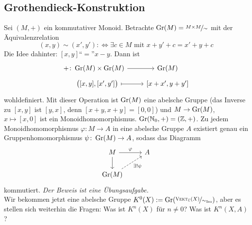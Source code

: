 \subsection*{Grothendieck-Konstruktion}
Sei $(M,+)$ ein kommutativer Monoid. Betrachte $\operatorname{Gr}(M)= \nicefrac{M \times M}{\sim}$ mit der Äquivalenzrelation
\[
	(x,y) \sim (x',y') :\iff \exists c \in M \text{ mit } x+y' +c = x' +y +c
\]
Die Idee dahinter: $[x,y]$\enquote{$=$}$x-y$. Dann ist 
\[
	\begin{tikzcd}[row sep=tiny]
		+ \colon \Gr(M) \times \Gr(M) \rar & \Gr(M) \\
		\quad \enbrace[\big]{[x,y] , [x',y']} \rar[mapsto] & \benbrace*{x+x',y+y'}  
	\end{tikzcd}
\]
wohldefiniert. Mit dieser Operation ist $\operatorname{Gr}(M)$ eine abelsche Gruppe (das Inverse zu $[x,y]$ ist $[y,x]$, denn $[x+y,x+y]=[0,0]$) und $M \to \operatorname{Gr}(M)$, $x  \mapsto [x,0]$ ist
ein Monoidhomomorphismus.
$\operatorname{Gr}(\mathbb{N}_0,+)= (\mathbb{Z},+)$.
Zu jedem Monoidhomomorphismus $\varphi \colon M \to A$ in eine abelsche Gruppe $A$ existiert genau ein Gruppenhomomorphismus $\psi \colon \operatorname{Gr}(M) \to A$, sodass das Diagramm
\[
	\begin{tikzcd}
		M \dar\rar["\varphi"] & A \\
		\Gr(M) \urar["\exists ! \psi"', dashed]
	\end{tikzcd}
\]
kommutiert. \emph{Der Beweis ist eine Übungsaufgabe.} \bigskip \\
Wir bekommen jetzt eine abelsche Gruppe $K^0(X) := \Gr \enbrace*{\nicefrac{\VEKT_{\mathds{C}}(X)}{\sim_{\Iso}}}$, aber es stellen sich weiterhin die Fragen: Was ist $K^n(X)$ für 
$n\not=0$? Was ist $K^n(X,A)$?

